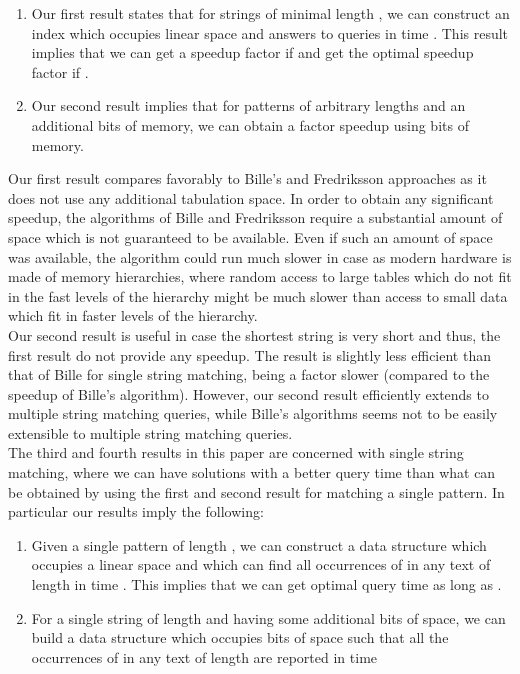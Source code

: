 \documentclass{article}
\newcommand{\?}{\mskip1.5mu}
\begin{document}
\begin{enumerate}
\item Our first result states that for  strings of minimal length , we can construct an index which occupies linear space and answers to queries in time . This result implies that we can get a speedup factor  if  and get the optimal speedup factor  if . 
\item Our second result implies that for  patterns of arbitrary lengths and an additional  bits of memory, we can obtain a factor  speedup using  bits of memory.
\end{enumerate}
Our first result compares favorably to Bille's and Fredriksson approaches as it does not use any additional tabulation space. In order to obtain any significant speedup, the algorithms of Bille and Fredriksson require a substantial amount of space  which is not guaranteed to be available. Even if such an amount of space was available, the algorithm could run much slower in case  as modern hardware is made of memory hierarchies, where random access to large tables which do not fit in the fast levels of the hierarchy might be much slower than access to small data which fit in faster levels of the hierarchy. 
\\ 
Our second result is useful in case the shortest string is very short and thus, the first result do not provide any speedup. The result is slightly less efficient than that of Bille for single string matching, being a factor  slower (compared to the  speedup of Bille's algorithm). However, our second result efficiently extends to multiple string matching queries, while Bille's algorithms seems not to be easily extensible to multiple string matching queries.\\
The third and fourth results in this paper are concerned with single string matching, where we can have solutions with a better query time than what can be obtained by using the first and second result for matching a single pattern. In particular our results imply the following:
\begin{enumerate}
\item Given a single pattern  of length , we can construct a data structure which occupies a linear space and which can find all  occurrences of  in any text of length  in time . This implies that we can get optimal query time   as long as .
\item For a single string of length  and having some additional  bits of space, we can build a data structure which occupies  bits of space such that all the  occurrences of  in any text of length  are reported in time 
\end{enumerate}
\end{document}
